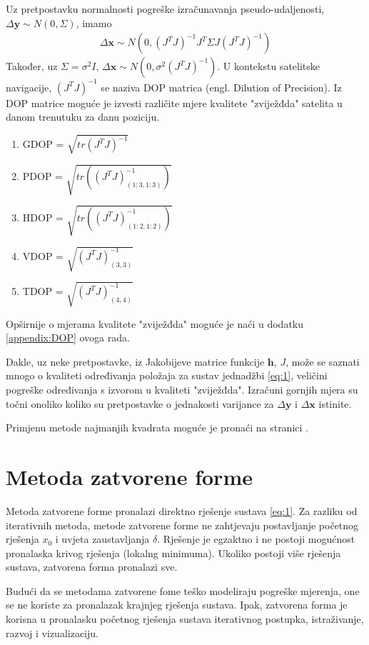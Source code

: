 \documentclass[a4paper,twoside,12pt]{memoir} %
\begin{document}
Uz pretpostavku normalnosti pogreške izračunavanja pseudo-udaljenosti,
\newline $\Delta \mathbf{y} \sim N(0,\Sigma)$, imamo
\begin{align}\label{eq:xerrorDistr}
	\Delta \mathbf{x} \sim N(0,(J^TJ)^{-1}J^T\Sigma J(J^TJ)^{-1})
\end{align}
Također, uz $\Sigma = \sigma^2I$, $\Delta \mathbf{x} \sim N(0,\sigma^2(J^TJ)^{-1})$.
U kontekstu satelitske navigacije, $(J^TJ)^{-1}$ se naziva DOP matrica (engl. Dilution of Precision).
Iz DOP matrice moguće je izvesti različite mjere kvalitete "zviježđda" satelita u danom trenutuku za danu poziciju.
\begin{enumerate}
	\item GDOP = $\sqrt{tr(J^TJ)^{-1}}$
	\item PDOP = $\sqrt{tr((J^TJ)^{-1}_{(1:3,1:3)})}$
	\item HDOP = $\sqrt{tr((J^TJ)^{-1}_{(1:2,1:2)})}$
	\item VDOP = $\sqrt{(J^TJ)^{-1}_{(3,3)}}$
	\item TDOP = $\sqrt{(J^TJ)^{-1}_{(4,4)}}$
\end{enumerate}
Opširnije o mjerama kvalitete "zviježđda" moguće je naći u dodatku \ref{appendix:DOP} ovoga rada.

Dakle, uz neke pretpostavke, iz Jakobijeve matrice funkcije $\mathbf{h}$, $J$, može se saznati mnogo o kvaliteti 
određivanja položaja za sustav jednadžbi \ref{eq:1}, veličini pogreške određivanja
s izvorom u kvaliteti "zviježđda".
Izračuni gornjih mjera su točni onoliko koliko su pretpostavke
o jednakosti varijance za $\Delta \mathbf{y}$ i $\Delta \mathbf{x}$
istinite.

Primjenu metode najmanjih kvadrata moguće je pronaći na stranici \pageref{stranica:nastavakLS}.
\section{Metoda zatvorene forme}
Metoda zatvorene forme pronalazi direktno rješenje sustava \ref{eq:1}.
Za razliku od iterativnih metoda,
metode zatvorene forme ne zahtjevaju postavljanje početnog rješenja $x_0$ i uvjeta zaustavljanja $\delta$. Rješenje je egzaktno i ne postoji mogućnost 
pronalaska krivog rješenja (lokalng minimuma). Ukoliko postoji više rješenja sustava, 
zatvorena forma pronalazi sve.

Budući da se metodama zatvorene fome teško modeliraju pogreške mjerenja,
one se ne koriste za pronalazak krajnjeg rješenja sustava.
Ipak,
zatvorena forma je korisna u pronalasku početnog rješenja sustava iterativnog postupka, istraživanje, razvoj i vizualizaciju.
\end{document}
